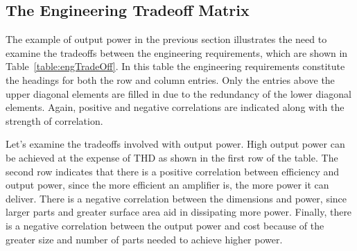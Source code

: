 \subsection{The Engineering Tradeoff Matrix}
\label{subsection:the-engineering-tradeoff-matrix}

The example of output power in the previous section illustrates the need
to examine the tradeoffs between the engineering requirements, which are
shown in Table~\ref{table:engTradeOff}. In this table the engineering requirements
constitute the headings for both the row and column entries. Only the
entries above the upper diagonal elements are filled in due to the
redundancy of the lower diagonal elements. Again, positive and negative
correlations are indicated along with the strength of correlation.

Let's examine the tradeoffs involved with output power. High output
power can be achieved at the expense of THD as shown in the first row of
the table. The second row indicates that there is a positive correlation
between efficiency and output power, since the more efficient an
amplifier is, the more power it can deliver. There is a negative
correlation between the dimensions and power, since larger parts and
greater surface area aid in dissipating more power. Finally, there is a
negative correlation between the output power and cost because of the
greater size and number of parts needed to achieve higher power.

